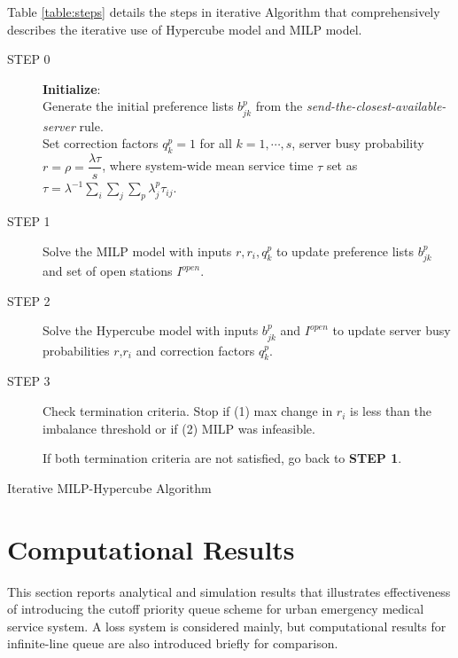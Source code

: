 \documentclass{article}
\begin{document}
Table \eqref{table:steps} details the steps in iterative Algorithm that comprehensively describes the iterative use of Hypercube model and MILP model.

\begin{table}
\noindent\makebox[\linewidth]{\rule{16cm}{0.4pt}}
\begin{description}
\item[STEP 0] \textbf{Initialize}:\\
Generate the initial preference lists $b^p_{jk}$ from the \textit{send-the-closest-available-server} rule. \\
Set correction factors $q_k^p=1$ for all $k=1,\cdots,s$, server busy probability $r=\rho=\dfrac{\lambda \tau}{s}$, where system-wide mean service time $\tau$ set as $\tau= \lambda^{-1} \sum_i \sum_j  \sum_p \lambda^p_j \tau_{ij}$.
\item[STEP 1] Solve the MILP model with inputs $r,r_i,q_k^p$ to update preference lists $b^p_{jk}$ and set of open stations $I^{open}$.
\item[STEP 2] Solve the Hypercube model with inputs $b^p_{jk}$ and $I^{open}$ to update server busy probabilities $r$,$r_i$ and correction factors $q_k^p$.
\item[STEP 3] Check termination criteria. Stop if (1) max change in $r_i$ is less than the imbalance threshold or if (2) MILP was infeasible.

If both termination criteria are not satisfied, go back to \textbf{STEP 1}.
\end{description}
\noindent\makebox[\linewidth]{\rule{16cm}{0.4pt}}
\caption{Iterative MILP-Hypercube Algorithm}
\label{table:steps}

\end{table}




\section{Computational Results}

This section reports analytical and simulation results that illustrates effectiveness of introducing the cutoff priority queue scheme for urban emergency medical service system. A loss system is considered mainly, but computational results for infinite-line queue are also introduced briefly for comparison.
\end{document}
